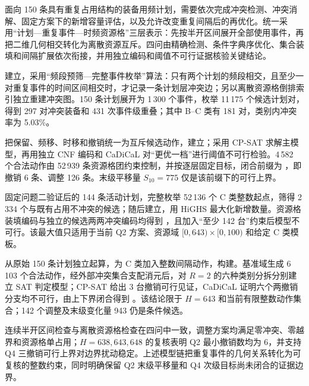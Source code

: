 \documentclass[UTF8,a4paper,zihao=-4]{ctexart}
\begin{document}
\CUMCMAbstractHeading
\begingroup
{}
\CUMCMAbstractParagraph
面向 150 条具有重复占用结构的装备用频计划，需要依次完成冲突检测、冲突消解、固定方案下的新增容量评估，以及允许改变重复间隔后的再优化。统一采用“计划—重复事件—时频资源格”三层表示：先按半开区间展开全部使用事件，再把二维几何相交转化为离散资源互斥。四问由精确检测、条件字典序优化、集合装填和间隔扩展依次衔接，并用独立编码和阈值不可行证据核验关键结论。

建立，采用“频段预筛—完整事件枚举”算法：只有两个计划的频段相交，且至少一对重复事件的时间区间相交时，才记录一条计划层冲突边；另以离散资源格倒排索引独立重建冲突图。150 条计划展开为 1\,300 个事件，枚举 11\,175 个候选计划对，得到 297 对冲突装备和 431 次事件级重叠；其中 B--C 类有 181 对，类别内冲突率为 5.03\%。

把保留、频移、时移和撤销统一为互斥候选动作，建立；采用 CP-SAT 求解主模型，再用独立 CNF 编码和 CaDiCaL 对“更优一档”进行阈值不可行检验。4\,582 个合法动作由 52\,939 条资源格团约束控制，并按逐层固定目标，闭合前缀为 ，即撤销 6 条、调整 126 条。末级平移量 $S_{10}=775$ 仅是该前缀下的可行上界。

固定问题二验证后的 144 条活动计划，完整枚举 52\,136 个 C 类整数起点，筛得 2\,334 个与既有占用不冲突的候选；随后建立，用 HiGHS 最大化新增数量。资源格装填编码与独立的候选两两冲突编码均得到 ，且加入“至少 142 台”约束后模型不可行。该最大值只适用于当前 Q2 方案、资源域 \([0,643)\times[0,100)\) 和给定 C 类模板。

从原始 150 条计划独立起算，为 C 类加入整数间隔动作，构建。基准域生成 6\,103 个合法动作，经外部冲突集合支配消元后，对 \(R=2\) 的六种类别分拆分别建立 SAT 判定模型；CP-SAT 给出 3 台撤销可行见证，CaDiCaL 证明六个两撤销分支均不可行，由上下界闭合得到 。该结论限于 \(H=643\) 和当前有限整数动作集合；142 个调整及末级变化量 943 仍是条件候选。

连续半开区间检查与离散资源格检查在四问中一致，调整方案均满足零冲突、零越界和资源格单占用；\(H=638,643,648\) 的复核表明 Q2 最小撤销数均为 6，并支持 Q4 三撤销可行上界对边界扰动稳定。上述模型链把重复事件的几何关系转化为可复核的整数约束，同时明确保留 Q2 末级平移量和 Q4 次级目标尚未闭合的证据边界。
\endgroup
\clearpage
\end{document}
